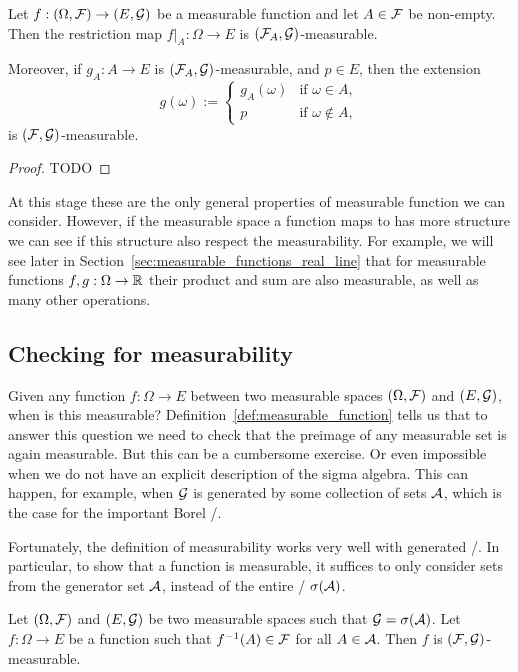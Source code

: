 \begin{proposition}
Let $f: (\Omega, \mathcal F) \to (E, \mathcal G)$ be a measurable function and let $A \in \mathcal F$ be non-empty. Then the restriction map $f|_A : \Omega \to E$ is $(\mathcal F_A, \mathcal G)$-measurable.

Moreover, if $g_A : A \to E$ is $(\mathcal F_A, \mathcal G)$-measurable, and $p \in E$, then the extension
\[
	g(\omega) := \begin{cases}
		g_A(\omega) &\text{if } \omega \in A,\\
		p &\text{if } \omega \notin A,
	\end{cases}
\]
is $(\mathcal F, \mathcal G)$-measurable.
\end{proposition}

\begin{proof}
TODO
\end{proof}

At this stage these are the only general properties of measurable function we can consider. However, if the measurable space a function maps to has more structure we can see if this structure also respect the measurability. For example, we will see later in Section~\ref{sec:measurable_functions_real_line} that for measurable functions $f, g : \Omega \to \mathbb R$ their product and sum are also measurable, as well as many other operations.

\subsection{Checking for measurability}

Given any function $f : \Omega \to E$ between two measurable spaces $(\Omega, \mathcal F)$ and $(E, \mathcal G)$, when is this measurable? Definition~\ref{def:measurable_function} tells us that to answer this question we need to check that the preimage of any measurable set is again measurable. But this can be a cumbersome exercise. Or even impossible when we do not have an explicit description of the sigma algebra. This can happen, for example, when $\mathcal G$ is generated by some collection of sets $\mathcal A$, which is the case for the important Borel \sigalg/. 

Fortunately, the definition of measurability works very well with generated \sigalgs/. In particular, to show that a function is measurable, it suffices to only consider sets from the generator set $\mathcal A$, instead of the entire \sigalg/ $\sigma(\mathcal A)$.

\begin{lemma}\label{lem:measurable_condition_generator}
Let $(\Omega, \mathcal F)$ and $(E, \mathcal G)$ be two measurable spaces such that $\mathcal G = \sigma(\mathcal A)$. Let $f: \Omega \to E$ be a function such that $f^{-1}(A) \in \mathcal F$ for all $A \in \mathcal A$. Then $f$ is $(\mathcal F, \mathcal G)$-measurable.
\end{lemma}

